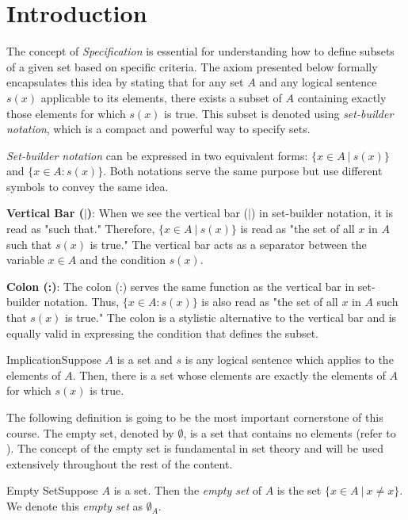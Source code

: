 \renewcommand{\theenumi}{\arabic{enumi}}
\renewcommand{\labelenumi}{\theenumi.}
\section{Introduction}
 
 The concept of \textit{Specification} is essential for understanding how to define subsets of a given set based on specific criteria. The axiom presented below formally encapsulates this idea by stating that for any set $A$ and any logical sentence $s(x)$ applicable to its elements, there exists a subset of $A$ containing exactly those elements for which $s(x)$ is true. This subset is denoted using \textit{set-builder notation}, which is a compact and powerful way to specify sets.

\textit{Set-builder notation} can be expressed in two equivalent forms: $\{x \in A \ | \ s(x)\}$ and $\{x \in A \colon s(x)\}$. Both notations serve the same purpose but use different symbols to convey the same idea.

    \textbf{Vertical Bar ($|$)}: When we see the vertical bar ($|$) in set-builder notation, it is read as "such that." Therefore, $\{x \in A \ | \ s(x)\}$ is read as "the set of all $x$ in $A$ such that $s(x)$ is true." The vertical bar acts as a separator between the variable $x \in A$ and the condition $s(x)$.

    \textbf{Colon (:)}: The colon (:) serves the same function as the vertical bar in set-builder notation. Thus, $\{x \in A \colon s(x)\}$ is also read as "the set of all $x$ in $A$ such that $s(x)$ is true." The colon is a stylistic alternative to the vertical bar and is equally valid in expressing the condition that defines the subset.

\begin{axiom}
    {Implication}Suppose $A$ is a set and $s$ is any logical sentence which applies to the elements of $A$. Then, there is a set whose elements are exactly the elements of $A$ for which $s(x)$ is true.
\end{axiom}

The following definition is going to be the most important cornerstone of this course. The empty set, denoted by $\emptyset$, is a set that contains no elements (refer to ). The concept of the empty set is fundamental in set theory and will be used extensively throughout the rest of the content.
    
\begin{definition}
    {Empty Set}Suppose $A$ is a set. Then the \textit{empty set} of $A$ is the set $\{x\in A \ | \ x\ne x\}$. We denote this \textit{empty set} as $\emptyset_A$.
\end{definition}

